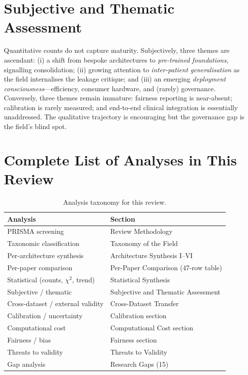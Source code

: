 \section{Subjective and Thematic Assessment}
Quantitative counts do not capture maturity. Subjectively, three themes are ascendant: (i) a shift from bespoke architectures to \emph{pre-trained foundations}, signalling consolidation; (ii) growing attention to \emph{inter-patient generalisation} as the field internalises the leakage critique; and (iii) an emerging \emph{deployment consciousness}---efficiency, consumer hardware, and (rarely) governance. Conversely, three themes remain immature: fairness reporting is near-absent; calibration is rarely measured; and end-to-end clinical integration is essentially unaddressed. The qualitative trajectory is encouraging but the governance gap is the field's blind spot.

\section{Complete List of Analyses in This Review}
\begin{table}[h]\centering\caption{Analysis taxonomy for this review.}\label{tab:revanalyses}
\footnotesize\begin{tabular}{ll}\toprule
Analysis & Section\\\midrule
PRISMA screening & Review Methodology\\
Taxonomic classification & Taxonomy of the Field\\
Per-architecture synthesis & Architecture Synthesis I--VI\\
Per-paper comparison & Per-Paper Comparison (47-row table)\\
Statistical (counts, $\chi^2$, trend) & Statistical Synthesis\\
Subjective / thematic & Subjective and Thematic Assessment\\
Cross-dataset / external validity & Cross-Dataset Transfer\\
Calibration / uncertainty & Calibration section\\
Computational cost & Computational Cost section\\
Fairness / bias & Fairness section\\
Threats to validity & Threats to Validity\\
Gap analysis & Research Gaps (15)\\\bottomrule
\end{tabular}\end{table}

